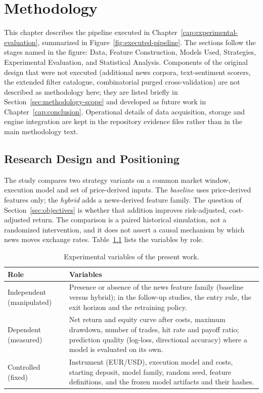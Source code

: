 \chapter{Methodology} \label{cap:methodology}

This chapter describes the pipeline executed in Chapter~\ref{cap:experimental-evaluation}, summarized in Figure~\ref{fig:executed-pipeline}. The sections follow the stages named in the figure: Data, Feature Construction, Models Used, Strategies, Experimental Evaluation, and Statistical Analysis. Components of the original design that were not executed (additional news corpora, text-sentiment scorers, the extended filter catalogue, combinatorial purged cross-validation) are not described as methodology here; they are listed briefly in Section~\ref{sec:methodology-scope} and developed as future work in Chapter~\ref{cap:conclusion}. Operational details of data acquisition, storage and engine integration are kept in the repository evidence files rather than in the main methodology text.



\section{Research Design and Positioning} \label{sec:positioning} \label{sec:research-design}

The study compares two strategy variants on a common market window, execution model and set of price-derived inputs. The \emph{baseline} uses price-derived features only; the \emph{hybrid} adds a news-derived feature family. The question of Section~\ref{sec:objectives} is whether that addition improves risk-adjusted, cost-adjusted return. The comparison is a paired historical simulation, not a randomized intervention, and it does not assert a causal mechanism by which news moves exchange rates. Table~\ref{tab:variables} lists the variables by role.

\begin{table}[htbp]
\centering
\caption{Experimental variables of the present work.}
\label{tab:variables}
\small
\begin{tabular}{p{3.0cm}p{9.8cm}}
\toprule
\textbf{Role} & \textbf{Variables} \\
\midrule
Independent (manipulated) &
Presence or absence of the news feature family (baseline versus hybrid); in the follow-up studies, the entry rule, the exit horizon and the retraining policy. \\
\midrule
Dependent (measured) &
Net return and equity curve after costs, maximum drawdown, number of trades, hit rate and payoff ratio; prediction quality (log-loss, directional accuracy) where a model is evaluated on its own. \\
\midrule
Controlled (fixed) &
Instrument (EUR/USD), execution model and costs, starting deposit, model family, random seed, feature definitions, and the frozen model artifacts and their hashes. \\
\bottomrule
\end{tabular}
\end{table}

